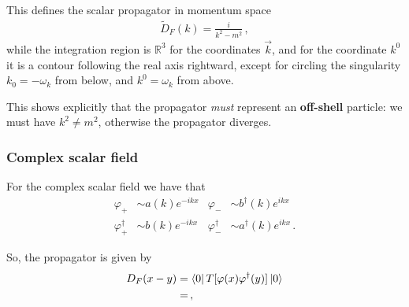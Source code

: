 \documentclass[main.tex]{subfiles}
\begin{document}
This defines the scalar propagator in momentum space 
%
\begin{align}
\widetilde{D}_{F}(k) = \frac{i}{k^2- m^2}
\,,
\end{align}
%
while the integration region is \(\mathbb{R}^{3}\) for the coordinates \(\vec{k}\), and for the coordinate \(k^{0}\) it is a contour following the real axis rightward, except for circling the singularity \(k_0 = - \omega_{k}\) from below, and \(k^{0} = \omega_{k}\) from above. 

This shows explicitly that the propagator \emph{must} represent an \textbf{off-shell} particle: we must have \(k^2 \neq m^2\), otherwise the propagator diverges.

\subsubsection{Complex scalar field}

For the complex scalar field we have that 
%
\begin{align}
\varphi_{+} &\sim a(k) e^{-ikx} 
&
\varphi_{-} &\sim b ^\dag(k) e^{ikx}  \\
\varphi_{+}^\dag &\sim b(k) e^{-ikx} 
&
\varphi_{-}^\dag &\sim a ^\dag(k) e^{ikx}
\,.
\end{align}

So, the propagator is given by 
%
\begin{align}
D_F (x-y) &= \bra{0} T [\varphi (x) \varphi ^\dag (y)] \ket{0}  \\
&= 
\,,
\end{align}
%
\end{document}
